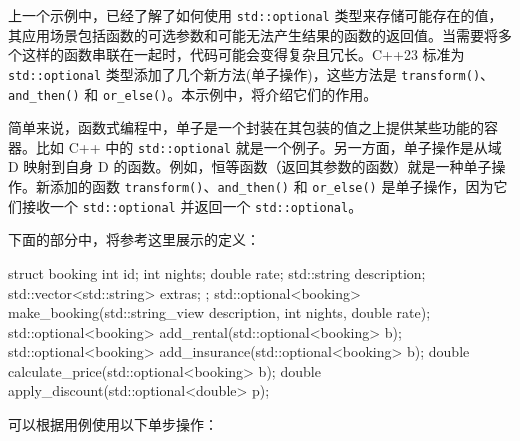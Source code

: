 上一个示例中，已经了解了如何使用 \verb|std::optional| 类型来存储可能存在的值，其应用场景包括函数的可选参数和可能无法产生结果的函数的返回值。当需要将多个这样的函数串联在一起时，代码可能会变得复杂且冗长。C++23 标准为 \verb|std::optional| 类型添加了几个新方法(单子操作)，这些方法是 \verb|transform()|、\verb|and_then()| 和 \verb|or_else()|。本示例中，将介绍它们的作用。

\begin{myNotic}
简单来说，函数式编程中，单子是一个封装在其包装的值之上提供某些功能的容器。比如 C++ 中的 \verb|std::optional| 就是一个例子。另一方面，单子操作是从域 D 映射到自身 D 的函数。例如，恒等函数（返回其参数的函数）就是一种单子操作。新添加的函数 \verb|transform()|、\verb|and_then()| 和 \verb|or_else()| 是单子操作，因为它们接收一个 \verb|std::optional| 并返回一个 \verb|std::optional|。
\end{myNotic}


下面的部分中，将参考这里展示的定义：

\begin{cpp}
struct booking
{
    int                        id;
    int                        nights;
    double                     rate;
    std::string                description;
    std::vector<std::string>   extras;
};
std::optional<booking> make_booking(std::string_view description,
int nights, double rate);
std::optional<booking> add_rental(std::optional<booking> b);
std::optional<booking> add_insurance(std::optional<booking> b);
double calculate_price(std::optional<booking> b);
double apply_discount(std::optional<double> p);
\end{cpp}


可以根据用例使用以下单步操作：

